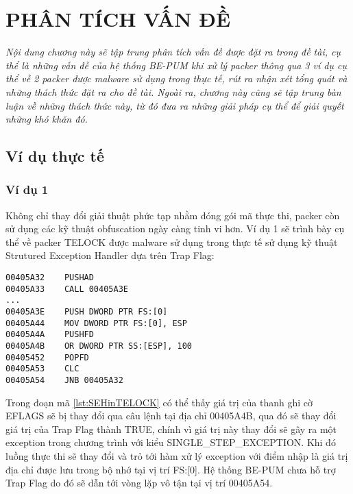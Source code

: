 
\newpage
\chapter{PHÂN TÍCH VẤN ĐỀ}

\begin{concept}[15cm]
\textit{Nội dung chương này sẽ tập trung phân tích vấn đề được đặt ra trong đề tài, cụ thể là những vấn đề của hệ thống BE-PUM khi xử lý packer thông qua 3 ví dụ cụ thể về 2 packer được malware sử dụng trong thực tế, rút ra nhận xét tổng quát và những thách thức đặt ra cho đề tài. Ngoài ra, chương này cũng sẽ tập trung bàn luận về những thách thức này, từ đó đưa ra những giải pháp cụ thể để giải quyết những khó khăn đó.}
\end{concept}

\section{Ví dụ thực tế}

\subsection{Ví dụ 1}

\hspace{0.5cm}Không chỉ thay đổi giải thuật phức tạp nhằm đóng gói mã thực thi, packer còn sử dụng các kỹ thuật obfuscation ngày càng tinh vi hơn. Ví dụ 1 sẽ trình bày cụ thể về packer TELOCK được malware sử dụng trong thực tế sử dụng kỹ thuật Strutured Exception Handler dựa trên Trap Flag:

\begin{code}
\begin{lstlisting}[captionpos=b,caption={Kỹ thuật Strutured Exception Handler sử dụng trong packer TELOCK},label={lst:SEHinTELOCK},frame=single]
00405A32	PUSHAD
00405A33	CALL 00405A3E
...
00405A3E	PUSH DWORD PTR FS:[0] 
00405A44	MOV DWORD PTR FS:[0], ESP
00405A4A	PUSHFD
00405A4B	OR DWORD PTR SS:[ESP], 100
00405452	POPFD
00405A53	CLC
00405A54	JNB 00405A32
\end{lstlisting}
\end{code}

\hspace{0.5cm}Trong đoạn mã \ref {lst:SEHinTELOCK} có thể thấy giá trị của thanh ghi cờ EFLAGS sẽ bị thay đổi qua câu lệnh tại địa chỉ 00405A4B, qua đó sẽ thay đổi giá trị của Trap Flag thành TRUE, chính vì giá trị này thay đổi sẽ gây ra một exception trong chương trình với kiểu SINGLE\_STEP\_EXCEPTION. Khi đó luồng thực thi sẽ thay đổi và trỏ tới hàm xử lý exception với điểm nhập là giá trị địa chỉ được lưu trong bộ nhớ tại vị trí FS:[0]. Hệ thống BE-PUM chưa hỗ trợ Trap Flag do đó sẽ dẫn tới vòng lặp vô tận tại vị trí 00405A54.

